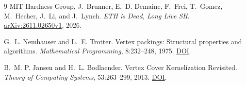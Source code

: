 \documentclass[11pt]{article}
\begin{document}
\begin{thebibliography}{9}
MIT Hardness Group, J.~Brunner, E.~D. Demaine, F.~Frei, T.~Gomez,
M.~Hecher, J.~Li, and J.~Lynch.
\emph{ETH is Dead, Long Live SH}.
\href{https://arxiv.org/abs/2611.02650v1}{arXiv:2611.02650v1}, 2026.

G.~L. Nemhauser and L.~E. Trotter.
Vertex packings: Structural properties and algorithms.
\emph{Mathematical Programming}, 8:232--248, 1975.
\href{https://doi.org/10.1007/BF01580444}{DOI}.

B.~M. P. Jansen and H.~L. Bodlaender.
Vertex Cover Kernelization Revisited.
\emph{Theory of Computing Systems}, 53:263--299, 2013.
\href{https://doi.org/10.1007/s00224-012-9393-4}{DOI}.
\end{thebibliography}
\end{document}
